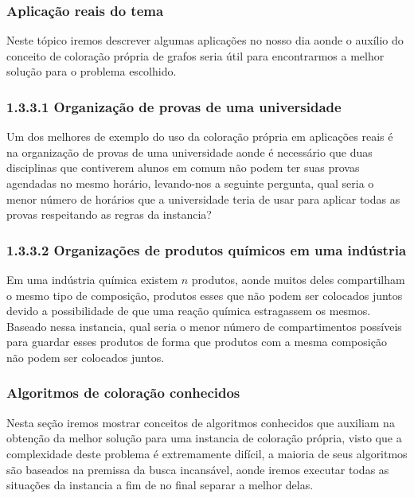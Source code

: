 \documentclass[12pt]{article}
\begin{document}
	\subsubsection{Aplicação reais do tema}
	
	Neste tópico iremos descrever algumas aplicações no nosso dia aonde o auxílio do conceito de coloração própria de grafos seria útil para encontrarmos a melhor solução para o problema escolhido.
	
	
	\subsubsection*{1.3.3.1 Organização de provas de uma universidade}
	
	Um dos melhores de exemplo do uso da coloração própria em aplicações reais é na organização de provas de uma universidade aonde é necessário que duas disciplinas que contiverem alunos em comum não podem ter suas provas agendadas no mesmo horário, levando-nos a seguinte pergunta, qual seria o menor número de horários que a universidade teria de usar para aplicar todas as provas respeitando as regras da instancia?
	
	
	\subsubsection*{   1.3.3.2 Organizações de produtos químicos em uma indústria}
	
	Em uma indústria química existem $n$ produtos, aonde muitos deles compartilham o mesmo tipo de composição, produtos esses que não podem ser colocados juntos devido a possibilidade de que uma reação química estragassem os mesmos. Baseado nessa instancia, qual seria o menor número de compartimentos possíveis para guardar esses produtos de forma que produtos com a mesma composição não podem ser colocados juntos.
	
	\subsubsection{Algoritmos de coloração conhecidos}
	
	Nesta seção iremos mostrar conceitos de algoritmos conhecidos que auxiliam na obtenção da melhor solução para uma instancia de coloração própria, visto que a complexidade deste problema é extremamente difícil, a maioria de seus algoritmos são baseados na premissa da busca incansável, aonde iremos executar todas as situações da instancia a fim de no final separar a melhor delas.
	
\end{document}
